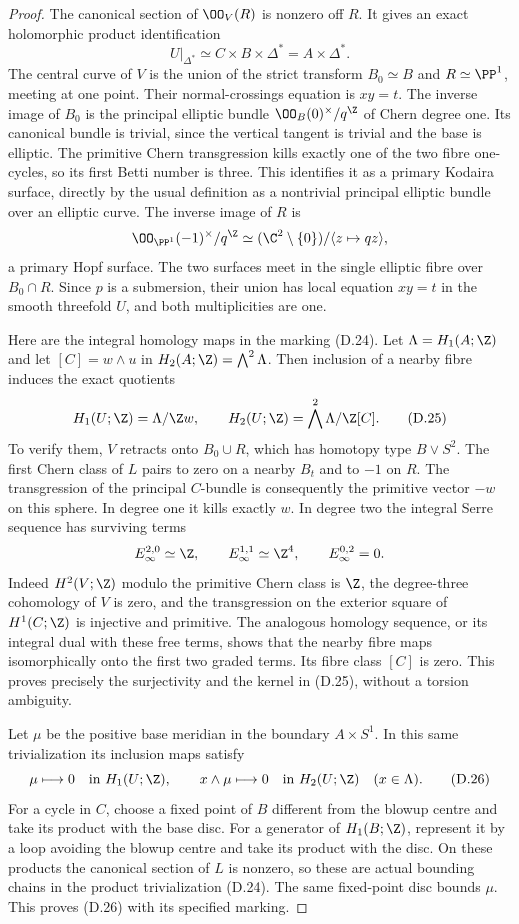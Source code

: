 \begin{proof}
The canonical section of $\OO_V(R)$ is nonzero off $R$.
It gives an exact holomorphic product identification
\[
 U|_{\Delta^*}\simeq C\times B\times\Delta^*
                         =A\times\Delta^*.
\tag{D.24}
\]
The central curve of $V$ is the union of the strict transform
$B_0\simeq B$ and $R\simeq\PP^1$, meeting at one point.
Their normal-crossings equation is $xy=t$. The inverse image
of $B_0$ is the principal elliptic bundle
$\OO_B(0)^\times/q^{\Z}$ of Chern degree one. Its canonical
bundle is trivial, since the vertical tangent is trivial and
the base is elliptic. The primitive Chern transgression
kills exactly one of the two fibre one-cycles, so its first
Betti number is three. This identifies it as a primary
Kodaira surface, directly by the usual definition as a
nontrivial principal elliptic bundle over an elliptic curve.
The inverse image of $R$ is
\[
 \OO_{\PP^1}(-1)^\times/q^{\Z}
       \simeq(\C^2\setminus\{0\})/\langle z\mapsto qz\rangle,
\]
a primary Hopf surface. The two surfaces meet in the single
elliptic fibre over $B_0\cap R$. Since $p$ is a submersion,
their union has local equation $xy=t$ in the smooth
threefold $U$, and both multiplicities are one.

Here are the integral homology maps in the marking (D.24).
Let $\Lambda=H_1(A;\Z)$ and let $[C]=w\wedge u$ in
$H_2(A;\Z)=\bigwedge^2\Lambda$. Then inclusion of a nearby
fibre induces the exact quotients
\[
 H_1(U;\Z)=\Lambda/\Z w,\qquad
 H_2(U;\Z)=\bigwedge^2\Lambda/\Z[C].
\tag{D.25}
\]
To verify them, $V$ retracts onto $B_0\cup R$, which has
homotopy type $B\vee S^2$. The first Chern class of $L$
pairs to zero on a nearby $B_t$ and to $-1$ on $R$.
The transgression of the principal $C$-bundle is consequently
the primitive vector $-w$ on this sphere. In degree one it
kills exactly $w$. In degree two the integral Serre sequence
has surviving terms
\[
 E_\infty^{2,0}\simeq\Z,
 \qquad E_\infty^{1,1}\simeq\Z^4,
 \qquad E_\infty^{0,2}=0.
\]
Indeed $H^2(V;\Z)$ modulo the primitive Chern class is
$\Z$, the degree-three cohomology of $V$ is zero, and the
transgression on the exterior square of $H^1(C;\Z)$ is
injective and primitive. The analogous homology sequence,
or its integral dual with these free terms, shows that the
nearby fibre maps isomorphically onto the first two graded
terms. Its fibre class $[C]$ is zero. This proves precisely
the surjectivity and the kernel in (D.25), without a torsion
ambiguity.

Let $\mu$ be the positive base meridian in the boundary
$A\times S^1$. In this same trivialization its inclusion
maps satisfy
\[
 \mu\longmapsto0\quad\hbox{in }H_1(U;\Z),
 \qquad
 x\wedge\mu\longmapsto0\quad\hbox{in }H_2(U;\Z)
 \quad(x\in\Lambda).
\tag{D.26}
\]
For a cycle in $C$, choose a fixed point of $B$ different
from the blowup centre and take its product with the base
disc. For a generator of $H_1(B;\Z)$, represent it by a loop
avoiding the blowup centre and take its product with the
disc. On these products the canonical section of $L$ is
nonzero, so these are actual bounding chains in the product
trivialization (D.24). The same fixed-point disc bounds
$\mu$. This proves (D.26) with its specified marking.


\end{proof}
